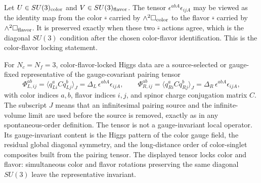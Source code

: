 Let \(U\in SU(3)_{\rm color}\) and \(V\in SU(3)_{\rm flavor}\).  The tensor
\(\epsilon^{abA}\epsilon_{ijA}\) may be viewed as the identity map from the
color \(\overline{\square}\) carried by \(\wedge^2\square_{\rm color}\) to
the flavor \(\overline{\square}\) carried by \(\wedge^2\square_{\rm flavor}\).
It is preserved exactly when these two \(\overline{\square}\) actions agree,
which is the diagonal \(SU(3)\) condition after the chosen color-flavor
identification.  This is the color-flavor locking statement.

\begin{definition}
\label{def:qcd-cfl-condensate-data}
For \(N_c=N_f=3\), color-flavor-locked Higgs data are a source-selected or
gauge-fixed representative of the gauge-covariant pairing tensor
\[
  \Phi^{ab}_{L,ij}
  =
  \langle q^a_{L i} C q^b_{L j}\rangle_J
  =
  \Delta_L\,\epsilon^{abA}\epsilon_{ijA},
  \qquad
  \Phi^{ab}_{R,ij}
  =
  \langle q^a_{R i} C q^b_{R j}\rangle_J
  =
  \Delta_R\,\epsilon^{abA}\epsilon_{ijA},
\]
with color indices \(a,b\), flavor indices \(i,j\), and spinor charge
conjugation matrix \(C\).  The subscript \(J\) means that an infinitesimal
pairing source and the infinite-volume limit are used before the source is
removed, exactly as in any spontaneous-order definition.  The tensor is not a
gauge-invariant local operator.  Its gauge-invariant content is the Higgs
pattern of the color gauge field, the residual global diagonal symmetry, and
the long-distance order of color-singlet composites built from the pairing
tensor.  The displayed tensor locks color and flavor: simultaneous color and
flavor rotations preserving the same diagonal \(SU(3)\) leave the
representative invariant.
\end{definition}

